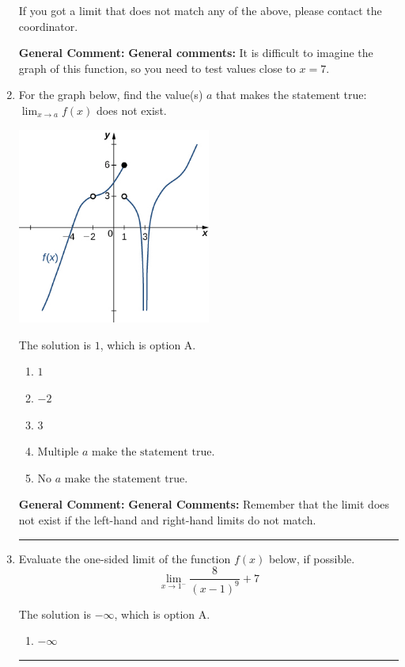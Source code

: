 \documentclass{extbook}[14pt]
\newcommand{\litem}[1]{\item #1

\rule{\textwidth}{0.4pt}}
\begin{document}
\begin{enumerate}
{\begin{enumerate}[label=\Alph*.]
If you got a limit that does not match any of the above, please contact the coordinator.
\end{enumerate}

\textbf{General Comment:} \textbf{General comments:} It is difficult to imagine the graph of this function, so you need to test values close to $x = 7$.
}
\litem{
For the graph below, find the value(s) $a$ that makes the statement true: $ \displaystyle \lim_{x \rightarrow a} f(x)$ does not exist.

\begin{center}
    \includegraphics[width=0.5\textwidth]{../Figures/evaluateLimitGraphicallyC.png}
\end{center}




The solution is \( 1 \), which is option A.\begin{enumerate}[label=\Alph*.]
\item \( 1 \)


\item \( -2 \)


\item \( 3 \)


\item \( \text{Multiple } a \text{ make the statement true}. \)


\item \( \text{No } a \text{ make the statement true}. \)


\end{enumerate}

\textbf{General Comment:} \textbf{General Comments:} Remember that the limit does not exist if the left-hand and right-hand limits do not match.
}
\litem{
Evaluate the one-sided limit of the function $f(x)$ below, if possible.
\[ \lim_{x \rightarrow 1^-} \frac{8}{(x-1)^9}+7 \]

The solution is \( -\infty \), which is option A.\begin{enumerate}[label=\Alph*.]
\item \( -\infty \)



\end{enumerate}}
\end{enumerate}
\end{document}
